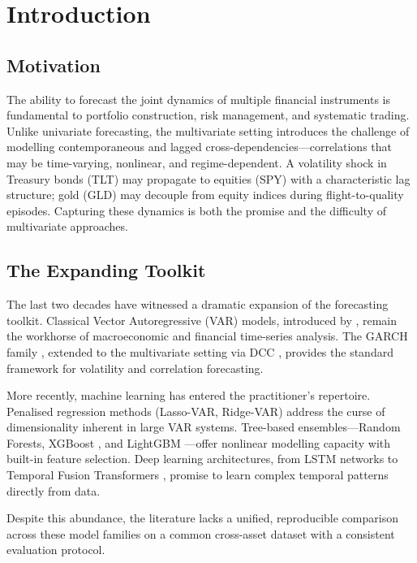 \documentclass[11pt,a4paper,twocolumn]{article}
\begin{document}
\section{Introduction}

\subsection{Motivation}

The ability to forecast the joint dynamics of multiple financial instruments is
fundamental to portfolio construction, risk management, and systematic trading.
Unlike univariate forecasting, the multivariate setting introduces the challenge
of modelling contemporaneous and lagged cross-dependencies---correlations that
may be time-varying, nonlinear, and regime-dependent.  A volatility shock in
Treasury bonds (TLT) may propagate to equities (SPY) with a characteristic lag
structure; gold (GLD) may decouple from equity indices during flight-to-quality
episodes.  Capturing these dynamics is both the promise and the difficulty of
multivariate approaches.

\subsection{The Expanding Toolkit}

The last two decades have witnessed a dramatic expansion of the forecasting
toolkit.  Classical Vector Autoregressive (VAR) models, introduced by
\citet{sims1980}, remain the workhorse of macroeconomic and financial
time-series analysis.  The GARCH family \citep{engle1982,bollerslev1986},
extended to the multivariate setting via DCC \citep{engle2002}, provides the
standard framework for volatility and correlation forecasting.

More recently, machine learning has entered the practitioner's repertoire.
Penalised regression methods (Lasso-VAR, Ridge-VAR) address the curse of
dimensionality inherent in large VAR systems.  Tree-based ensembles---Random
Forests, XGBoost \citep{chen2016}, and LightGBM \citep{ke2017}---offer
nonlinear modelling capacity with built-in feature selection.  Deep learning
architectures, from LSTM networks \citep{hochreiter1997} to Temporal Fusion
Transformers \citep{lim2021}, promise to learn complex temporal patterns
directly from data.

Despite this abundance, the literature lacks a unified, reproducible comparison
across these model families on a common cross-asset dataset with a consistent
evaluation protocol.
\end{document}
